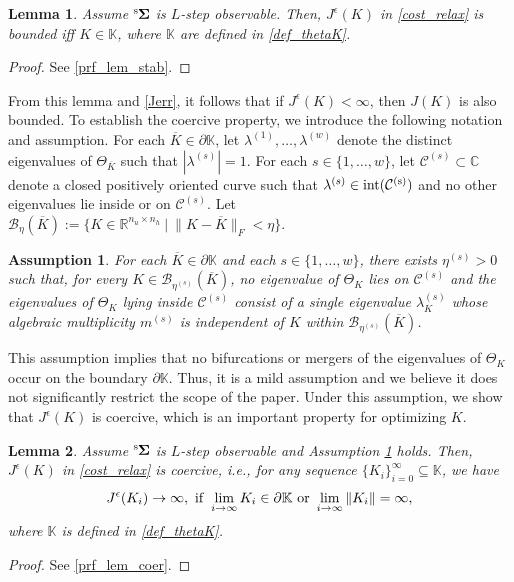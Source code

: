 \documentclass[preprint,5p,times,twocolumn]{elsarticle}
\newcommand{\bm}[1]{{\mbox{\boldmath $#1$}}}
\newtheorem{assumption}{Assumption}
\newtheorem{lem}{Lemma}
\def\rms{{}^{\rm s}\hspace{-0.2mm}}
\begin{document}
\begin{lem}\label{lem_stab}
 Assume $\rms {\bm \Sigma}$ is $L$-step observable. Then, $J^{\epsilon}(K)$ in \eqref{cost_relax} is bounded iff $K \in \mathbb K$, where $\mathbb K$ are defined in \eqref{def_thetaK}. 
\end{lem}
\begin{proof}
    See \ref{prf_lem_stab}. 
\end{proof}

From this lemma and \eqref{Jerr}, it follows that if $J^{\epsilon}(K) < \infty$, then $J(K)$ is also bounded. To establish the coercive property, we introduce the following notation and assumption. For each $\overline K\in\partial\mathbb K$, let $\lambda^{(1)},\dots,\lambda^{(w)}$
denote the distinct eigenvalues of $\Theta_{\overline K}$ such that $|\lambda^{(s)}|=1$.
For each $s\in\{1,\dots,w\}$, let $\mathcal C^{(s)} \subset \mathbb C$ denote a closed positively oriented curve such that
$\lambda^{(s)}\in\rm{int}(\mathcal C^{(s)})$ and no other eigenvalues lie inside or on $\mathcal C^{(s)}$. Let $\mathcal B_{\eta}(\overline{K}) := \{K \in \mathbb R^{n_u \times n_h} ~|~ \|K -\overline{K}\|_F < \eta \}$. 
\begin{assumption}\label{ass_NOBIF}
For each $\overline K\in\partial\mathbb K$ and each $s\in\{1,\dots,w\}$, there exists $\eta^{(s)}>0$ such that, for every $K\in\mathcal B_{\eta^{(s)}}(\overline K)$, no eigenvalue of $\Theta_{K}$ lies on $\mathcal C^{(s)}$ and the eigenvalues of $\Theta_{K}$ lying inside $\mathcal C^{(s)}$ consist of a single eigenvalue $\lambda^{(s)}_K$ whose algebraic multiplicity $m^{(s)}$ is independent of $K$ within $\mathcal B_{\eta^{(s)}}(\overline K)$. 
\end{assumption}
This assumption implies that no bifurcations or mergers of the eigenvalues of $\Theta_K$ occur on the boundary $\partial\mathbb K$. Thus, it is a mild assumption and we believe it does not significantly restrict the scope of the paper. Under this assumption, we show that $J^{\epsilon}(K)$ is coercive, which is an important property for optimizing $K$.

\begin{lem}\label{lem_coer}
 Assume $\rms {\bm \Sigma}$ is $L$-step observable and Assumption \ref{ass_NOBIF} holds. Then, $J^{\epsilon}(K)$ in \eqref{cost_relax} is coercive, i.e., for any sequence $\{K_i\}_{i=0}^{\infty} \subseteq \mathbb K$, we have
 \begin{align}
     J^{\epsilon}(K_i) \rightarrow \infty,~ {\rm if}~\lim_{i\rightarrow \infty}K_i \in\partial \mathbb K~{\rm or}~\lim_{i\rightarrow \infty}\|K_i\| = \infty,
 \end{align}
 where $\mathbb K$ is defined in \eqref{def_thetaK}. 
\end{lem}
\begin{proof}
See \ref{prf_lem_coer}. 
\end{proof}
\end{document}
